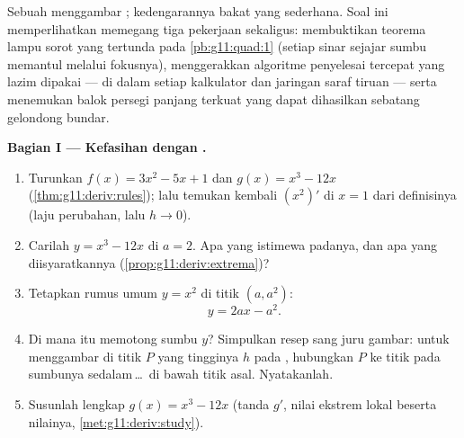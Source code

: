 \begin{problem}
\label{pb:g11:deriv:1}
Sebuah  menggambar ; kedengarannya bakat yang sederhana.
Soal ini memperlihatkan  memegang tiga pekerjaan sekaligus:
membuktikan teorema lampu sorot yang tertunda pada
\cref{pb:g11:quad:1} (setiap sinar sejajar sumbu 
memantul melalui fokusnya), menggerakkan algoritme penyelesai
 tercepat yang lazim dipakai --- di dalam setiap
kalkulator dan jaringan saraf tiruan --- serta menemukan balok
persegi panjang terkuat yang dapat dihasilkan sebatang gelondong bundar.

\medskip
\noindent\textbf{Bagian I --- Kefasihan dengan .}
\begin{enumerate}
  \item Turunkan $f(x) = 3x^2 - 5x + 1$ dan
        $g(x) = x^3 - 12x$
        (\cref{thm:g11:deriv:rules}); lalu temukan kembali $\left(x^2
        \right)'$ di $x = 1$ dari definisinya (laju
        perubahan, lalu $h \to 0$).
  \item Carilah  $y = x^3 - 12x$ di $a = 2$. Apa yang
        istimewa padanya, dan apa yang diisyaratkannya
        (\cref{prop:g11:deriv:extrema})?
  \item Tetapkan rumus umum   $y = x^2$
        di titik $(a, a^2)$:
        \[
        y = 2ax - a^2 .
        \]
  \item Di mana  itu memotong sumbu $y$? Simpulkan
        resep sang juru gambar: untuk menggambar  di titik $P$
        yang tingginya $h$ pada , hubungkan $P$ ke titik pada
        sumbunya sedalam\,\dots\ di bawah titik asal. Nyatakanlah.
  \item Susunlah  lengkap
        $g(x) = x^3 - 12x$ (tanda $g'$, nilai ekstrem lokal beserta
        nilainya, \cref{met:g11:deriv:study}).
\end{enumerate}


\end{problem}
